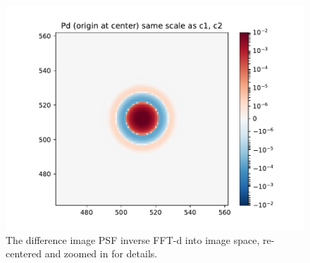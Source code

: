 \begin{figure}
\begin{center}
\includegraphics[width=5.5in]{fig/fft_steps_direct_Pd_zoomed.pdf}
\end{center}
\caption{\label{fig:fft_steps_direct_Pd}The difference image PSF
  inverse FFT-d into image space, re-centered and zoomed in for
  details.}
\end{figure}
%
\clearpage
%

